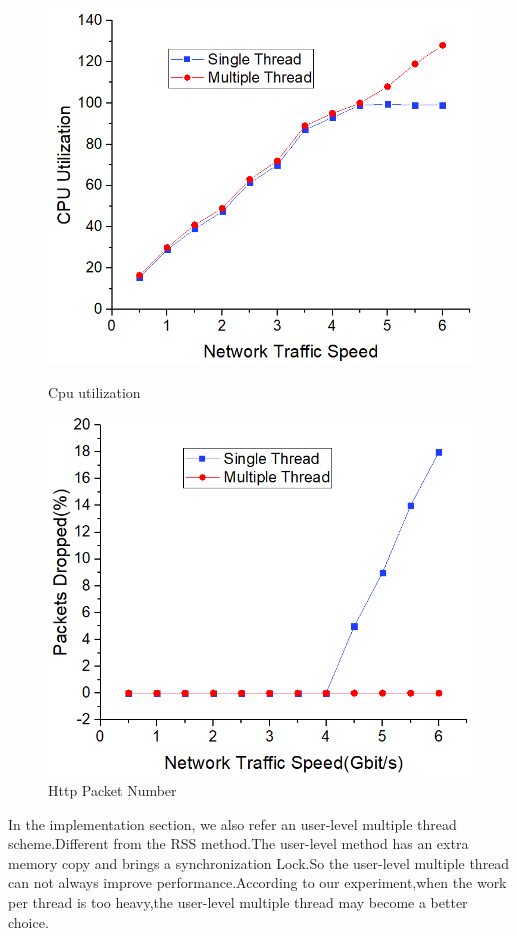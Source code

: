 \documentclass[conference]{IEEEtran}
\begin{document}
\begin{figure}
\begin{minipage}[t]{0.495\linewidth}
\flushleft
\includegraphics[width=\textwidth]{./picture/Figure10.jpg}
\caption{Cpu utilization} 
\label{fig:11}
\end{minipage}
\begin{minipage}[t]{0.495\linewidth}
\flushright
\includegraphics[width=\textwidth]{./picture/Figure11.jpg}
\caption{Http Packet Number}
\label{fig:12}
\end{minipage}
\end{figure} 
\newline\indent In the implementation section, we also refer an user-level multiple thread scheme.Different from the RSS method.The user-level method has an extra memory copy and brings a synchronization Lock.So the user-level multiple thread can not always improve performance.According to our experiment,when the work per thread is too heavy,the user-level multiple thread may become a better choice. 
\end{document}
